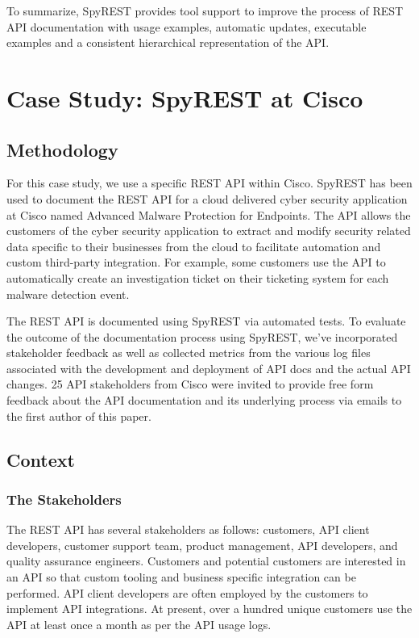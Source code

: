 \documentclass[10pt, conference]{IEEEtran}
\begin{document}
To summarize, SpyREST provides tool support to improve the process of REST API documentation with usage examples, automatic updates, executable examples and a consistent hierarchical representation of the API.

\section{Case Study: SpyREST at Cisco}

\subsection{Methodology}
For this case study, we use a specific REST API within Cisco. SpyREST has been used to document the REST API for a cloud delivered cyber security application at Cisco named Advanced Malware Protection for Endpoints. The API allows the customers of the cyber security application to extract and modify security related data specific to their businesses from the cloud to facilitate automation and custom third-party integration. For example, some customers use the API to automatically create an investigation ticket on their ticketing system for each malware detection event.

The REST API is documented using SpyREST via automated tests. To evaluate the outcome of the documentation process using SpyREST, we've incorporated stakeholder feedback as well as collected metrics from the various log files associated with the development and deployment of API docs and the actual API changes. 25 API stakeholders from Cisco were invited to provide free form feedback about the API documentation and its underlying process via emails to the first author of this paper.

\subsection{Context}
\subsubsection{The Stakeholders} %
The REST API has several stakeholders as follows: customers, API client developers, customer support team, product management, API developers, and quality assurance engineers. Customers and potential customers are interested in an API so that custom tooling and business specific integration can be performed. API client developers are often employed by the customers to implement API integrations. At present, over a hundred unique customers use the API at least once a month as per the API usage logs.
\end{document}
